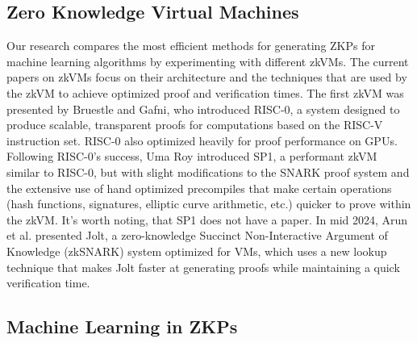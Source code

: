 \documentclass{scrartcl}
\begin{document}
\subsection{Zero Knowledge Virtual Machines}

Our research compares the most efficient methods for generating ZKPs for machine learning algorithms by experimenting with different zkVMs. The current papers on zkVMs focus on their architecture and the techniques that are used by the zkVM to achieve optimized proof and verification times. The first zkVM was presented by Bruestle and Gafni\cite{bruestle2023risc}, who introduced RISC-0, a system designed to produce scalable, transparent proofs for computations based on the RISC-V instruction set. RISC-0 also optimized heavily for proof performance on GPUs. Following RISC-0's success, Uma Roy\cite{Roy2024} introduced SP1, a performant zkVM similar to RISC-0, but with slight modifications to the SNARK proof system and the extensive use of hand optimized precompiles that make certain operations (hash functions, signatures, elliptic curve arithmetic, etc.) quicker to prove within the zkVM. It's worth noting, that SP1 does not have a paper. In mid 2024, Arun et al.\cite{arun2024jolt} presented Jolt, a zero-knowledge Succinct Non-Interactive Argument of Knowledge (zkSNARK) system optimized for VMs, which uses a new lookup technique that makes Jolt faster at generating proofs while maintaining a quick verification time.

\subsection{Machine Learning in ZKPs}
\end{document}
